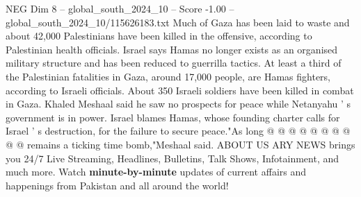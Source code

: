 \begin{textsample}{NEG Dim 8 – global\_south\_2024\_10 – Score -1.00 – global\_south\_2024\_10/115626183.txt}
Much of Gaza has been laid to waste and about 42,000 Palestinians have been killed in the offensive, according to Palestinian health officials.
Israel says Hamas no longer exists as an organised military structure and has been reduced to guerrilla tactics.
At least a third of the Palestinian fatalities in Gaza, around 17,000 people, are Hamas fighters, according to Israeli officials.
About 350 Israeli soldiers have been killed in combat in Gaza.
Khaled Meshaal said he saw no prospects for peace while Netanyahu ' s government is in power.
Israel blames Hamas, whose founding charter calls for Israel ' s destruction, for the failure to secure peace."As long @ @ @ @ @ @ @ @ @ @ remains a ticking time bomb,"Meshaal said.
ABOUT US ARY NEWS brings you 24/7 Live Streaming, Headlines, Bulletins, Talk Shows, Infotainment, and much more.
Watch \textbf{minute-by-minute} updates of current affairs and happenings from Pakistan and all around the world!

\end{textsample}
